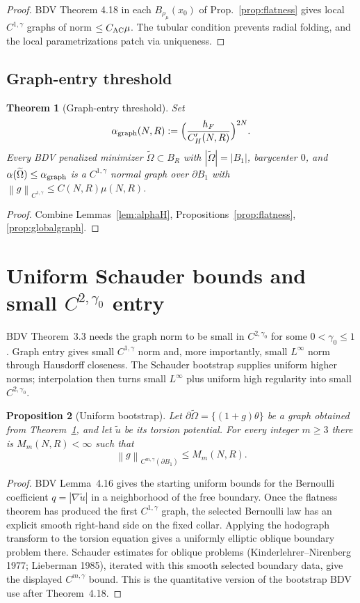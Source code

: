 \documentclass[11pt]{article}
\newtheorem{theorem}{Theorem}
\newtheorem{proposition}[theorem]{Proposition}
\theoremstyle{definition}
\newcommand{\norm}[1]{\left\|#1\right\|}
\newcommand{\abs}[1]{\left|#1\right|}
\begin{document}
\begin{proof}
BDV Theorem 4.18 in each $B_{\rho_\mu}(x_0)$ of Prop.~\ref{prop:flatness}
gives local $C^{1,\gamma}$ graphs of norm $\le C_{\rm AC}\mu$. The
tubular condition prevents radial folding, and the local parametrizations
patch via uniqueness.
\end{proof}

\subsection{Graph-entry threshold}

\begin{theorem}[Graph-entry threshold]\label{thm:graphentry}
Set
\[
\alpha_{\rm graph}(N,R):=\Bigl(\frac{h_F}{C_H'(N,R)}\Bigr)^{2N}.
\]
Every BDV penalized minimizer $\widetilde\Omega\subset B_R$ with
$\abs{\widetilde\Omega}=\abs{B_1}$, barycenter $0$, and
\(
\alpha(\widetilde\Omega)\le\alpha_{\rm graph}
\)
is a $C^{1,\gamma}$ normal graph over $\partial B_1$ with
$\norm{g}_{C^{1,\gamma}}\le C(N,R)\mu(N,R)$.
\end{theorem}

\begin{proof}
Combine Lemmas~\ref{lem:alphaH}, Propositions~\ref{prop:flatness},
\ref{prop:globalgraph}.
\end{proof}

\section{Uniform Schauder bounds and small $C^{2,\gamma_0}$ entry}\label{sec:bootstrap}

BDV Theorem~3.3 needs the graph norm to be small in $C^{2,\gamma_0}$ for some
$0<\gamma_0\le1$. Graph entry gives small $C^{1,\gamma}$ norm and, more
importantly, small $L^\infty$ norm through Hausdorff closeness. The Schauder
bootstrap supplies uniform higher norms; interpolation then turns small
$L^\infty$ plus uniform high regularity into small $C^{2,\gamma_0}$.

\begin{proposition}[Uniform bootstrap]\label{prop:bootstrap}
Let $\partial\widetilde\Omega=\{(1+g)\theta\}$ be a graph obtained from
Theorem~\ref{thm:graphentry}, and let $\widetilde u$ be its torsion potential.
For every integer $m\ge3$ there is $M_m(N,R)<\infty$ such that
\[
\norm{g}_{C^{m,\gamma}(\partial B_1)}\le M_m(N,R).
\]
\end{proposition}

\begin{proof}
BDV Lemma~4.16 gives the starting uniform bounds for the Bernoulli coefficient
$q=\abs{\nabla\widetilde u}$ in a neighborhood of the free boundary. Once the
flatness theorem has produced the first $C^{1,\gamma}$ graph, the selected
Bernoulli law has an explicit smooth right-hand side on the fixed collar.
Applying the hodograph transform to the torsion equation gives a uniformly
elliptic oblique boundary problem there. Schauder estimates for oblique
problems (Kinderlehrer--Nirenberg 1977; Lieberman 1985), iterated with this
smooth selected boundary data, give the displayed $C^{m,\gamma}$ bound. This
is the quantitative version of the bootstrap BDV use after Theorem~4.18.
\end{proof}
\end{document}
